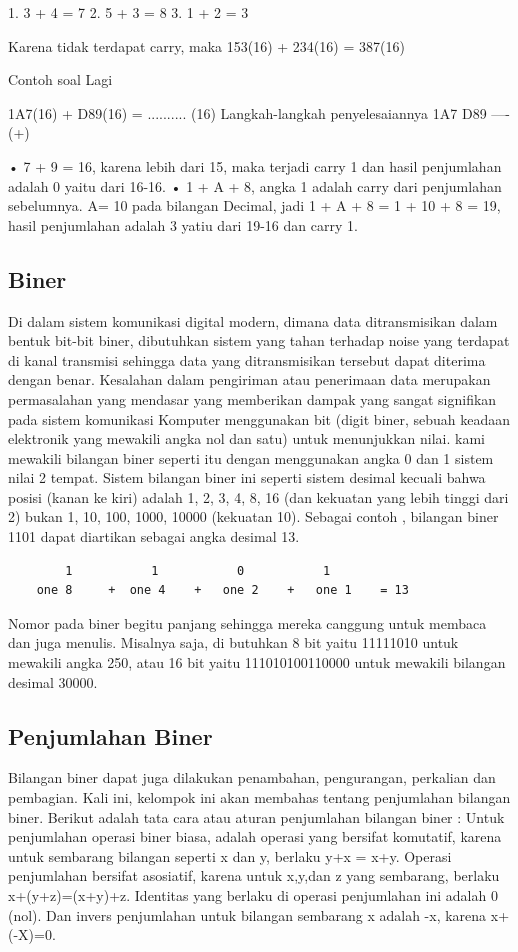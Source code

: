 1. 3 + 4 = 7
2. 5 + 3 = 8
3. 1 + 2 = 3

Karena tidak terdapat carry, maka 153(16) + 234(16) = 387(16)

Contoh soal Lagi 

1A7(16) + D89(16) = .......... (16)
Langkah-langkah penyelesaiannya
1A7
D89
---- (+)

•	7 + 9 = 16, karena lebih dari 15, maka terjadi carry 1 dan hasil penjumlahan adalah 0 yaitu dari 16-16.
•	1 + A + 8, angka 1 adalah carry dari penjumlahan sebelumnya. A= 10 pada bilangan Decimal, jadi 1 + A + 8 = 1 + 10 + 8 = 19, hasil penjumlahan adalah 3 yatiu dari 19-16 dan carry 1.


\subsection {Biner}
Di dalam sistem komunikasi digital modern, dimana data ditransmisikan dalam bentuk bit-bit biner, dibutuhkan sistem yang tahan terhadap noise yang terdapat di kanal transmisi sehingga data yang ditransmisikan tersebut dapat diterima dengan benar. Kesalahan dalam pengiriman atau penerimaan data merupakan permasalahan yang mendasar yang memberikan dampak yang sangat signifikan pada sistem komunikasi
Komputer menggunakan bit (digit biner, sebuah keadaan elektronik yang mewakili angka nol dan satu) untuk menunjukkan nilai. kami mewakili bilangan biner seperti itu dengan menggunakan angka 0 dan 1 sistem nilai 2 tempat. Sistem bilangan biner ini seperti sistem desimal kecuali bahwa posisi (kanan ke kiri) adalah 1, 2, 3, 4, 8, 16 (dan kekuatan yang lebih tinggi dari 2) bukan 1, 10, 100, 1000, 10000 (kekuatan 10). Sebagai contoh , bilangan biner 1101 dapat diartikan sebagai angka desimal 13.
	\begin{verbatim}
		1			1			0			1
	one 8	  +	 one 4	  +	  one 2    +   one 1 	= 13
	\end{verbatim}
Nomor pada  biner begitu panjang sehingga mereka canggung  untuk membaca dan juga menulis. Misalnya saja, di butuhkan 8 bit yaitu  11111010 untuk mewakili angka 250, atau 16 bit yaitu 111010100110000 untuk mewakili bilangan desimal 30000.


\subsection {Penjumlahan Biner}
Bilangan biner dapat juga dilakukan penambahan, pengurangan, perkalian dan pembagian. Kali ini, kelompok ini akan membahas tentang penjumlahan bilangan biner. Berikut adalah tata cara atau aturan penjumlahan bilangan biner :
Untuk penjumlahan operasi biner biasa, adalah operasi yang bersifat komutatif, karena untuk sembarang bilangan seperti x dan y, berlaku y+x = x+y. Operasi penjumlahan bersifat asosiatif, karena untuk x,y,dan z yang sembarang, berlaku x+(y+z)=(x+y)+z. Identitas yang berlaku di operasi penjumlahan ini adalah 0 (nol). Dan invers penjumlahan untuk bilangan sembarang x adalah -x, karena x+(-X)=0.


